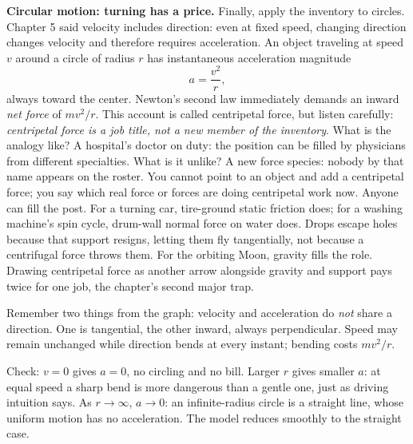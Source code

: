 \textbf{Circular motion: turning has a price.} Finally, apply the inventory to circles. Chapter 5 said velocity includes direction: even at fixed speed, changing direction changes velocity and therefore requires acceleration. An object traveling at speed \(v\) around a circle of radius \(r\) has instantaneous acceleration magnitude
\[
a=\frac{v^2}{r},
\]
always toward the center. Newton's second law immediately demands an inward \emph{net force} of \(mv^2/r\). This account is called centripetal force, but listen carefully: \emph{centripetal force is a job title, not a new member of the inventory}. What is the analogy like? A hospital's doctor on duty: the position can be filled by physicians from different specialties. What is it unlike? A new force species: nobody by that name appears on the roster. You cannot point to an object and add a centripetal force; you say which real force or forces are doing centripetal work now. Anyone can fill the post. For a turning car, tire-ground static friction does; for a washing machine's spin cycle, drum-wall normal force on water does. Drops escape holes because that support resigns, letting them fly tangentially, not because a centrifugal force throws them. For the orbiting Moon, gravity fills the role. Drawing centripetal force as another arrow alongside gravity and support pays twice for one job, the chapter's second major trap.

\begin{center}
\end{center}

Remember two things from the graph: velocity and acceleration do \emph{not} share a direction. One is tangential, the other inward, always perpendicular. Speed may remain unchanged while direction bends at every instant; bending costs \(mv^2/r\).

Check: \(v=0\) gives \(a=0\), no circling and no bill. Larger \(r\) gives smaller \(a\): at equal speed a sharp bend is more dangerous than a gentle one, just as driving intuition says. As \(r\to\infty\), \(a\to0\): an infinite-radius circle is a straight line, whose uniform motion has no acceleration. The model reduces smoothly to the straight case.

